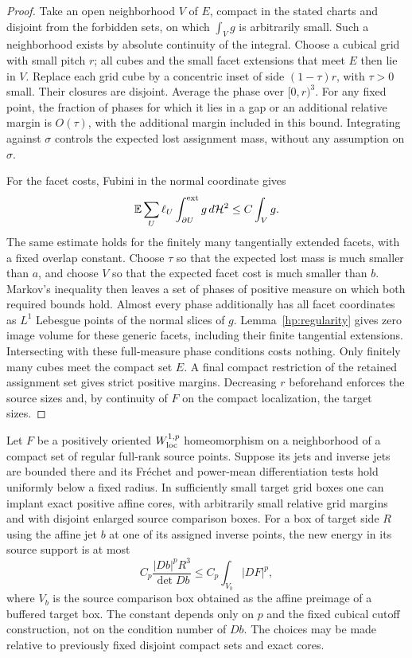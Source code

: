 \begin{proof}
Take an open neighborhood $V$ of $E$, compact in the stated charts and
disjoint from the forbidden sets, on which $\int_Vg$ is arbitrarily
small.  Such a neighborhood exists by absolute continuity of the
integral.  Choose a cubical grid with small pitch $r$; all cubes and
the small facet extensions that meet $E$ then lie in $V$.  Replace
each grid cube by a concentric inset of side $(1-\tau)r$, with
$\tau>0$ small.  Their closures are disjoint.  Average the phase over
$[0,r)^3$.  For any fixed point, the fraction of phases for which it
lies in a gap or an additional relative margin is $O(\tau)$, with
the additional margin included in this bound.  Integrating against
$\sigma$ controls the expected lost assignment mass, without any
assumption on $\sigma$.

For the facet costs, Fubini in the normal coordinate gives
\[
 \mathbb E\sum_U\ell_U
       \int_{\partial U}^{\rm ext}g\,d\mathcal H^2
       \leq C\int_Vg.
\]
The same estimate holds for the finitely many tangentially extended
facets, with a fixed overlap constant.  Choose $\tau$ so that the
expected lost mass is much smaller than $a$, and choose $V$ so that
the expected facet cost is much smaller than $b$.  Markov's
inequality then leaves a set of phases of positive measure on which
both required bounds hold.  Almost every phase additionally has all
facet coordinates as $L^1$ Lebesgue points of the normal slices of
$g$.  Lemma~\ref{hp:regularity} gives zero image volume for these
generic facets, including their finite tangential extensions.
Intersecting with these full-measure phase conditions costs nothing.
Only finitely many cubes meet the compact set $E$.  A final compact
restriction of the retained assignment set gives strict positive
margins.  Decreasing $r$ beforehand enforces the source sizes and,
by continuity of $F$ on the compact localization, the target sizes.
\end{proof}

\begin{lemma}\label{hp:regular-implant}
Let $F$ be a positively oriented $W^{1,p}_{\rm loc}$ homeomorphism
on a neighborhood of a compact set of regular full-rank source
points.  Suppose its jets and inverse jets are bounded there and its
Fr\'echet and power-mean differentiation tests hold uniformly below
a fixed radius.  In sufficiently small target grid boxes one can
implant exact positive affine cores, with arbitrarily small relative
grid margins and with disjoint enlarged source comparison boxes.
For a box of target side $R$ using the affine jet $b$ at one of its
assigned inverse points, the new energy in its source support is at
most
\begin{equation}\label{hp:regular-implant-cost}
 C_p\frac{|Db|^pR^3}{\det Db}
 \leq C_p\int_{V_b}|DF|^p,
\end{equation}
where $V_b$ is the source comparison box obtained as the affine
preimage of a buffered target box.  The constant depends only
on $p$ and the fixed cubical cutoff construction, not on the condition
number of $Db$.  The choices may be made relative to previously
fixed disjoint compact sets and exact cores.
\end{lemma}

